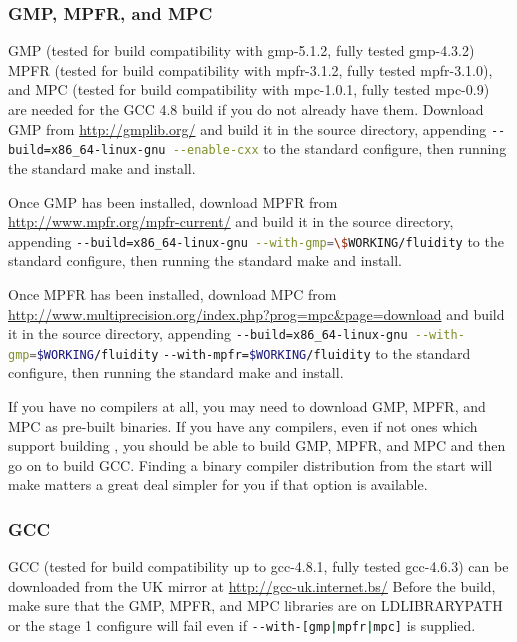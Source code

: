 \subsubsection{GMP, MPFR, and MPC}
\label{sec:required_libraries_compilers_gmp_mpfr_mpc}

GMP (tested for \fluidity build compatibility with gmp-5.1.2, fully tested
gmp-4.3.2) MPFR (tested for \fluidity build compatibility with mpfr-3.1.2,
fully tested mpfr-3.1.0), and MPC (tested for \fluidity build compatibility
with mpc-1.0.1, fully tested mpc-0.9) are needed for the GCC 4.8 build if you
do not already have them.  Download GMP from \url{http://gmplib.org/} and build
it in the source directory, appending
\lstinline[language=bash]+--build=x86_64-linux-gnu --enable-cxx+ to the
standard configure, then running the standard make and install.

Once GMP has been installed, download MPFR from
\url{http://www.mpfr.org/mpfr-current/} and build it in the source directory,
appending
\lstinline[language=bash]+--build=x86_64-linux-gnu --with-gmp=\$WORKING/fluidity+
to the standard configure, then running the
standard make and install.

Once MPFR has been installed, download MPC from
\url{http://www.multiprecision.org/index.php?prog=mpc&page=download} and build
it in the source directory, appending
\lstinline[language=bash]+--build=x86_64-linux-gnu --with-gmp=$WORKING/fluidity+
\lstinline[language=bash]+--with-mpfr=$WORKING/fluidity+
to the standard configure, then running the
standard make and install.

If you have no compilers at all, you may need to download GMP, MPFR, and MPC as
pre-built binaries. If you have any compilers, even if not ones which support
building \fluidity, you should be able to build GMP, MPFR, and MPC and then go
on to build GCC. Finding a binary compiler distribution from the start will
make matters a great deal simpler for you if that option is available.

\subsubsection{GCC}
\label{sec:required_libraries_compilers_gcc}

GCC (tested for \fluidity build compatibility up to gcc-4.8.1, fully tested
gcc-4.6.3) can be downloaded from the UK mirror at
\url{http://gcc-uk.internet.bs/} Before the build, make sure that the GMP,
MPFR, and MPC libraries are on LD{\textunderscore}LIBRARY{\textunderscore}PATH
or the stage 1 configure will fail even if
\lstinline[language=bash]+--with-[gmp|mpfr|mpc]+ is supplied.


